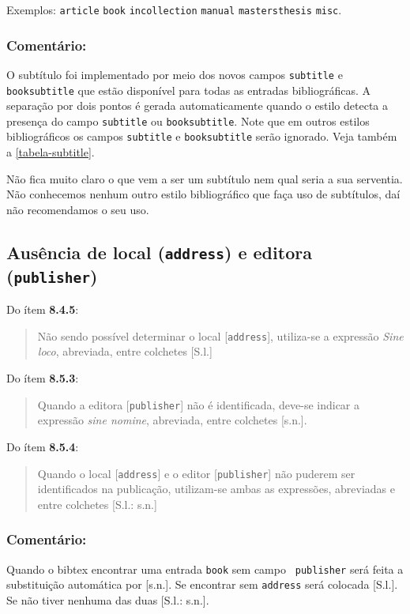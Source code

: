 \documentclass[a4paper]{ltxdoc}
\begin{document}
Exemplos:
{\tt article}\cite{7.4.2.3-2}
{\tt book}\cite{7.1.3-5,7.1.3-10,7.10-3,8.1.1.1-3,8.2.1,8.5.3}
{\tt incollection}\cite{7.2.2-1}
{\tt manual}\cite{NBR6023:2000,7.1.3-7,7.1.3-8,7.1.3-9,7.10-4,8.1.2.1-1}
{\tt mastersthesis}\cite{8.11.4-2}
{\tt misc}\cite{7.13.2-1}.

\subsubsection{Comentário:}
O subtítulo foi implementado por meio dos novos campos {\tt subtitle}
e {\tt booksubtitle} que estão disponível para todas as entradas bibliográficas.
A separação por dois pontos é gerada automaticamente quando o estilo detecta a
presença do campo {\tt subtitle} ou {\tt booksubtitle}. Note que em outros
estilos bibliográficos os campos {\tt subtitle} e {\tt booksubtitle} serão
ignorado. Veja também a \autoref{tabela-subtitle}.

Não fica muito claro o que vem a ser um subtítulo nem qual seria a sua
serventia. Não conhecemos nenhum outro estilo bibliográfico que faça uso de
subtítulos, daí não recomendamos o seu uso.

\subsection{Ausência de local ({\tt address}) e editora ({\tt publisher})}

Do ítem {\bf 8.4.5}\cite{NBR6023:2000}:
\begin{quote}
Não sendo possível determinar o local [{\tt address}], utiliza-se a expressão \emph{Sine loco},
abreviada, entre colchetes [S.l.]
\end{quote}

Do ítem {\bf 8.5.3}\cite{NBR6023:2000}:
\begin{quote}
Quando a editora [{\tt publisher}] não é identificada, deve-se indicar a expressão
\emph{sine nomine}, abreviada, entre colchetes [s.n.].
\end{quote}

Do ítem {\bf 8.5.4}\cite{NBR6023:2000}:
\begin{quote}
Quando o local [{\tt address}] e o editor [{\tt publisher}] não puderem ser
identificados na publicação, utilizam-se ambas as expressões, abreviadas e
entre colchetes [S.l.: s.n.]
\end{quote}

\subsubsection{Comentário:}
Quando o \textsf{bibtex} encontrar uma entrada {\tt book} sem campo {\tt
publisher} será feita a substituição automática por [s.n.].
\cite{8.5.3}
Se encontrar sem {\tt address} será colocada [S.l.]. \cite{8.4.5-1,8.4.5-2}
Se não tiver nenhuma das duas [S.l.: s.n.]. \cite{8.5.4}
\end{document}
